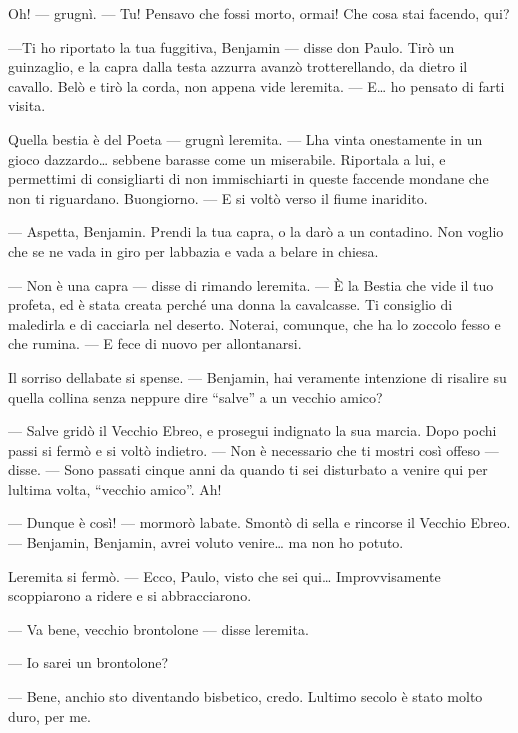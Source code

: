 Oh! --- grugnì. --- Tu! Pensavo che fossi morto, ormai! Che cosa stai
facendo, qui?

---Ti ho riportato la tua fuggitiva, Benjamin --- disse don Paulo. Tirò
un guinzaglio, e la capra dalla testa azzurra avanzò trotterellando, da
dietro il cavallo. Belò e tirò la corda, non appena vide
l\textquotesingle eremita. --- E\ldots{} ho pensato di farti visita.

Quella bestia è del Poeta --- grugnì l\textquotesingle eremita. ---
L\textquotesingle ha vinta onestamente in un gioco
d\textquotesingle azzardo\ldots{} sebbene barasse come un miserabile.
Riportala a lui, e permettimi di consigliarti di non immischiarti in
queste faccende mondane che non ti riguardano. Buongiorno. --- E si
voltò verso il fiume inaridito.

--- Aspetta, Benjamin. Prendi la tua capra, o la darò a un contadino.
Non voglio che se ne vada in giro per l\textquotesingle abbazia e vada a
belare in chiesa.

--- Non è una capra --- disse di rimando l\textquotesingle eremita. ---
È la Bestia che vide il tuo profeta, ed è stata creata perché una donna
la cavalcasse. Ti consiglio di maledirla e di cacciarla nel deserto.
Noterai, comunque, che ha lo zoccolo fesso e che rumina. --- E fece di
nuovo per allontanarsi.

Il sorriso dell\textquotesingle abate si spense. --- Benjamin, hai
veramente intenzione di risalire su quella collina senza neppure dire
``salve'' a un vecchio amico?

--- Salve gridò il Vecchio Ebreo, e prosegui indignato la sua marcia.
Dopo pochi passi si fermò e si voltò indietro. --- Non è necessario che
ti mostri così offeso --- disse. --- Sono passati cinque anni da quando
ti sei disturbato a venire qui per l\textquotesingle ultima volta,
``vecchio amico''. Ah!

--- Dunque è così! --- mormorò l\textquotesingle abate. Smontò di sella
e rincorse il Vecchio Ebreo. --- Benjamin, Benjamin, avrei voluto
venire\ldots{} ma non ho potuto.

L\textquotesingle eremita si fermò. --- Ecco, Paulo, visto che sei
qui\ldots{} Improvvisamente scoppiarono a ridere e si abbracciarono.

--- Va bene, vecchio brontolone --- disse l\textquotesingle eremita.

--- Io sarei un brontolone?

--- Bene, anch\textquotesingle io sto diventando bisbetico, credo.
L\textquotesingle ultimo secolo è stato molto duro, per me.

